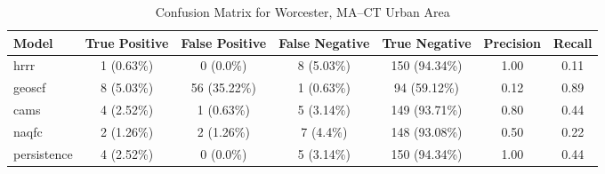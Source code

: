 \begin{table}[h!]
\centering
\begin{tabular}{lcccccc}
\hline
Model & True Positive & False Positive & False Negative & True Negative & Precision & Recall\\ \hline
hrrr & 1 (0.63\%) & 0 (0.0\%) & 8 (5.03\%) & 150 (94.34\%) & \cellcolor{green!25}1.00 & \cellcolor{red!25}0.11 \\ 
geoscf & 8 (5.03\%) & 56 (35.22\%) & 1 (0.63\%) & 94 (59.12\%) & \cellcolor{red!25}0.12 & \cellcolor{green!25}0.89 \\ 
cams & 4 (2.52\%) & 1 (0.63\%) & 5 (3.14\%) & 149 (93.71\%) & \cellcolor{red!25}0.80 & \cellcolor{green!25}0.44 \\ 
naqfc & 2 (1.26\%) & 2 (1.26\%) & 7 (4.4\%) & 148 (93.08\%) & \cellcolor{red!25}0.50 & \cellcolor{red!25}0.22 \\ 
persistence & 4 (2.52\%) & 0 (0.0\%) & 5 (3.14\%) & 150 (94.34\%) & 1.00 & 0.44 \\ 
\hline
\end{tabular}
\caption{Confusion Matrix for Worcester, MA--CT Urban Area}
\end{table}
